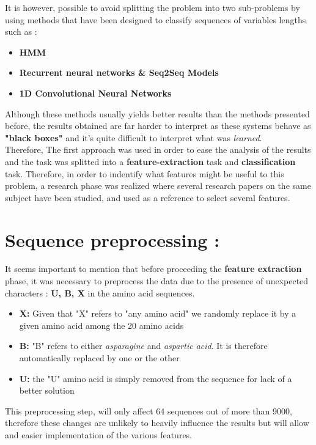 \documentclass{bioinfo}
\begin{document}
It is however, possible to avoid splitting the problem into two sub-problems by using methods that have been designed to classify sequences of variables lengths such as :\\
\begin{itemize}
	\item \textbf{HMM} 
	\item \textbf{Recurrent neural networks \& Seq2Seq Models}
	\item \textbf{1D Convolutional Neural Networks}
\end{itemize}

Although these methods usually yields better results than the methods presented before, the results obtained are far harder to interpret as these systems behave as \textbf{"black boxes"} and it's quite difficult to interpret what was \textit{learned}. \\

Therefore, The first approach was used in order to ease the analysis of the results and the task was splitted into a \textbf{feature-extraction} task and \textbf{classification} task. Therefore, in order to indentify what features might be useful to this problem, a research phase was realized where several research papers on the same subject have been studied, and used as a reference to select several features. 

\section{Sequence preprocessing : }
It seems important to mention that before proceeding the \textbf{feature extraction} phase, it was necessary to preprocess the data due to the presence of unexpected characters : \textbf{U, B, X} in the amino acid sequences. 

\begin{itemize}
	\item \textbf{X: } Given that "X" refers to "any amino acid" we randomly replace it by a given amino acid among the 20 amino acids
	\item \textbf{B: } "B" refers to either \textit{asparagine} and \textit{aspartic acid}. It is therefore automatically replaced by one or the other
	\item \textbf{U: } the "U" amino acid is simply removed from the sequence for lack of a better solution

\end{itemize}
 
 This preprocessing step, will only affect 64 sequences out of more than 9000, therefore these changes are unlikely to heavily influence the results but will allow and easier implementation of the various features.
\end{document}
